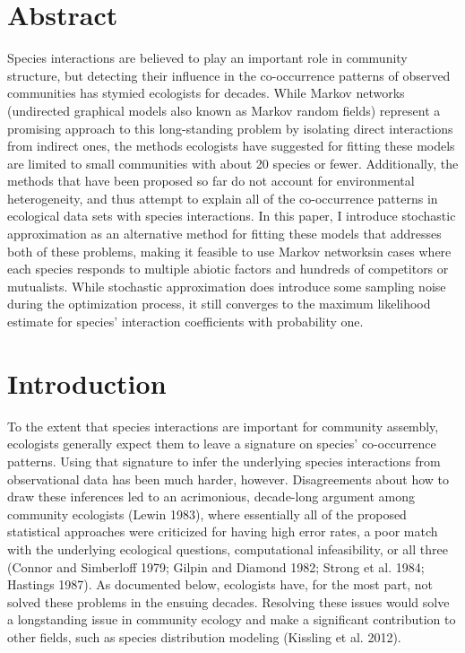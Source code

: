 \section{Abstract}\label{abstract}

Species interactions are believed to play an important role in community
structure, but detecting their influence in the co-occurrence patterns
of observed communities has stymied ecologists for decades. While Markov
networks (undirected graphical models also known as Markov random
fields) represent a promising approach to this long-standing problem by
isolating direct interactions from indirect ones, the methods ecologists
have suggested for fitting these models are limited to small communities
with about 20 species or fewer. Additionally, the methods that have been
proposed so far do not account for environmental heterogeneity, and thus
attempt to explain all of the co-occurrence patterns in ecological data
sets with species interactions. In this paper, I introduce stochastic
approximation as an alternative method for fitting these models that
addresses both of these problems, making it feasible to use Markov
networksin cases where each species responds to multiple abiotic factors
and hundreds of competitors or mutualists. While stochastic
approximation does introduce some sampling noise during the optimization
process, it still converges to the maximum likelihood estimate for
species' interaction coefficients with probability one.

\section{Introduction}\label{introduction}

To the extent that species interactions are important for community
assembly, ecologists generally expect them to leave a signature on
species' co-occurrence patterns. Using that signature to infer the
underlying species interactions from observational data has been much
harder, however. Disagreements about how to draw these inferences led to
an acrimonious, decade-long argument among community ecologists (Lewin
1983), where essentially all of the proposed statistical approaches were
criticized for having high error rates, a poor match with the underlying
ecological questions, computational infeasibility, or all three (Connor
and Simberloff 1979; Gilpin and Diamond 1982; Strong et al. 1984;
Hastings 1987). As documented below, ecologists have, for the most part,
not solved these problems in the ensuing decades. Resolving these issues
would solve a longstanding issue in community ecology and make a
significant contribution to other fields, such as species distribution
modeling (Kissling et al. 2012).

